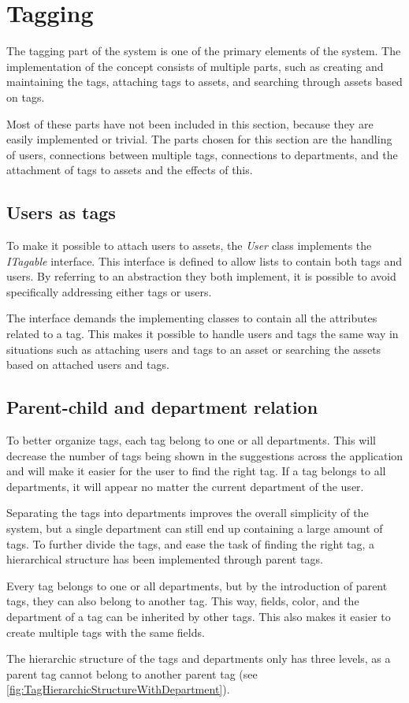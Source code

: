 \section{Tagging} \label{sc:Tagging}
The tagging part of the system is one of the primary elements of the system. The implementation of the concept consists of multiple parts, such as creating and maintaining the tags, attaching tags to assets, and searching through assets based on tags.
\par
Most of these parts have not been included in this section, because they are easily implemented or trivial. The parts chosen for this section are the handling of users, connections between multiple tags, connections to departments, and the attachment of tags to assets and the effects of this.

\subsection{Users as tags}
To make it possible to attach users to assets, the \textit{User} class implements the \textit{ITagable} interface. This interface is defined to allow lists to contain both tags and users. By referring to an abstraction they both implement, it is possible to avoid specifically addressing either tags or users. 
\par
The interface demands the implementing classes to contain all the attributes related to a tag. This makes it possible to handle users and tags the same way in situations such as attaching users and tags to an asset or searching the assets based on attached users and tags.

\subsection{Parent-child and department relation}
To better organize tags, each tag belong to one or all departments. This will decrease the number of tags being shown in the suggestions across the application and will make it easier for the user to find the right tag. If a tag belongs to all departments, it will appear no matter the current department of the user.
\par
Separating the tags into departments improves the overall simplicity of the system, but a single department can still end up containing a large amount of tags. To further divide the tags, and ease the task of finding the right tag, a hierarchical structure has been implemented through parent tags.
\par
Every tag belongs to one or all departments, but by the introduction of parent tags, they can also belong to another tag. This way, fields, color, and the department of a tag can be inherited by other tags. This also makes it easier to create multiple tags with the same fields.
\par
The hierarchic structure of the tags and departments only has three levels, as a parent tag cannot belong to another parent tag (see \autoref{fig:TagHierarchicStructureWithDepartment}).

